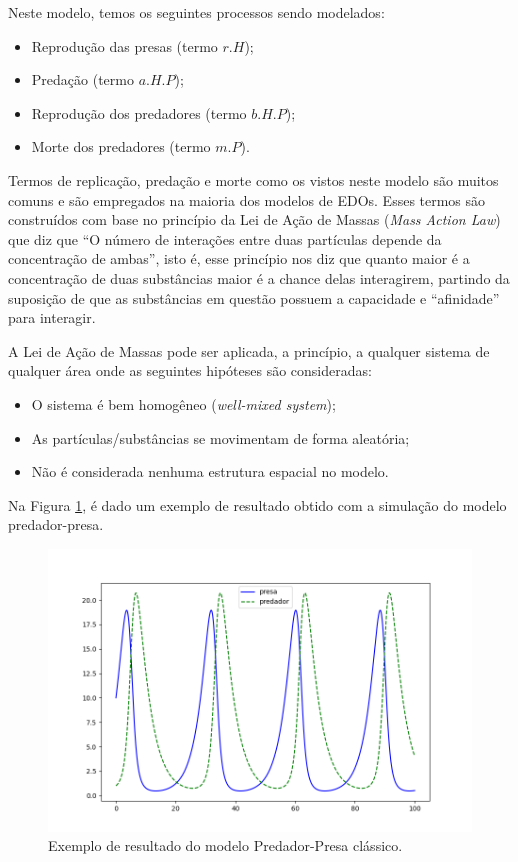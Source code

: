 \documentclass[
	12pt,				%
	openright,			%
	oneside,			%
	a4paper,			%
	main=brazil,
	english,			%
	]{ufsj-abntex2}
\begin{document}
Neste modelo, temos os seguintes processos sendo modelados: 
\begin{itemize}
    \item Reprodução das presas (termo $r.H$);
    \item Predação (termo $a.H.P$);
    \item Reprodução dos predadores (termo $b.H.P$);
    \item Morte dos predadores (termo $m.P$). 
\end{itemize}

Termos de replicação, predação e morte como os vistos neste modelo são muitos comuns e são empregados na maioria dos modelos de EDOs. Esses termos são construídos com base no princípio da Lei de Ação de Massas (\textit{Mass Action Law}) que diz que ``O número de interações entre duas partículas depende da concentração de ambas'', isto é, esse princípio nos diz que quanto maior é a concentração de duas substâncias maior é a chance delas interagirem, partindo da suposição de que as substâncias em questão possuem a capacidade e ``afinidade'' para interagir.

A Lei de Ação de Massas pode ser aplicada, a princípio, a qualquer sistema de qualquer área onde as seguintes hipóteses são consideradas: 
    \begin{itemize}
        \item O sistema é bem homogêneo (\textit{well-mixed system}); 
        \item As partículas/substâncias se movimentam de forma aleatória; 
        \item Não é considerada nenhuma estrutura espacial no modelo.
    \end{itemize}

Na Figura \ref{fig:hostprey}, é dado um exemplo de resultado obtido com a simulação do modelo predador-presa. 

\begin{figure}[h]
    \centering
    \includegraphics[scale=0.6]{imgs/hostprey.png} 
    \caption{Exemplo de resultado do modelo Predador-Presa clássico.}
    \label{fig:hostprey}
\end{figure}
\end{document}
